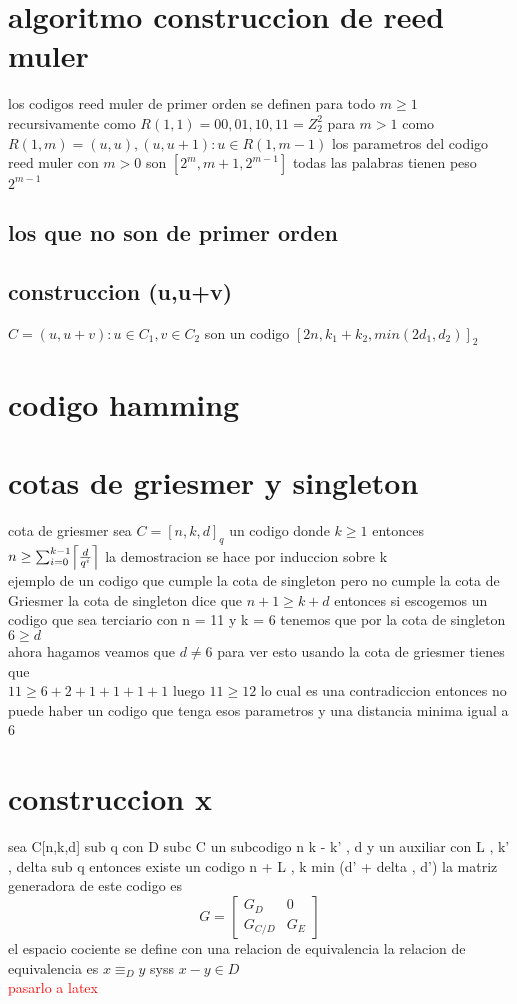 \documentclass[12p]{article}
\DeclarePairedDelimiter\ceil{\lceil}{\rceil}
\newcommand{\rojo}[1]{
  \textcolor{red}{#1}
}
\begin{document}
\section{algoritmo construccion de reed muler}
los codigos reed muler de primer orden se definen para todo $m \geq 1 $
recursivamente como
$R(1,1)= {00,01,10,11} = Z _ 2 ^ 2$
para $ m > 1 $
como $R(1,m) = {(u,u),(u,u+1):u \in R(1,m-1)}$
los parametros del codigo reed muler con $ m > 0$ son
$[2^m , m + 1 , 2^{m-1}]$
todas las palabras tienen peso $2^{m-1}$
\subsection{los que no son de primer orden}

\subsection{construccion (u,u+v)}
$C = {(u,u+v): u \in C_1 ,v \in C_2}$ son un codigo
$[2n,k_1 + k_2 , min(2d_1 , d_2)]_2$

\section{codigo hamming}

\section{cotas de griesmer y singleton}
cota de griesmer
sea $ C=[n,k,d]_ q $ un codigo donde $ k \geq 1 $ entonces
$ n \geq \sum _ { i = 0 } ^ { k -1 }  \ceil*{\frac { d } {   q  ^ i}} $
la demostracion se hace por induccion sobre k \\
ejemplo de un codigo que cumple la cota de singleton pero no cumple la
cota de Griesmer
la cota de singleton dice que $n + 1 \geq k + d$
entonces si escogemos un codigo que sea terciario con n = 11 y k = 6
tenemos que por la cota de singleton $ 6 \geq d $  \\
ahora hagamos veamos que $d \neq 6$ para ver esto
usando la cota de griesmer tienes que \\
$ 11 \geq 6 + 2 + 1 + 1 + 1 + 1$
luego $11 \geq 12$ lo cual es una contradiccion entonces no puede
haber un codigo que tenga esos parametros y una distancia minima igual a 6 
\section{construccion x}
sea C[n,k,d] sub q con D subc C un subcodigo n k - k' , d
y un auxiliar con L , k' , delta sub q
entonces existe un codigo n + L , k min (d' + delta , d')
la matriz generadora de este codigo es
\[
  G =
  \begin{bmatrix}
    G _ D & 0 \\
    G _ {C/D} & G _ E
  \end{bmatrix}
\]
el espacio cociente se define con una relacion de equivalencia
la relacion de equivalencia es $ x \equiv _ D y $ syss $ x - y \in D $ \\
\rojo{pasarlo a latex}
\end{document}
